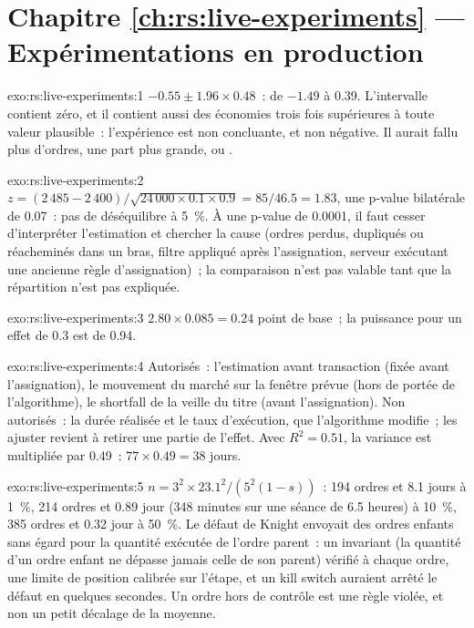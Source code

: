 \section*{Chapitre \ref{ch:rs:live-experiments} --- Expérimentations en production}

\begin{solution}{exo:rs:live-experiments:1}
$-0.55 \pm 1.96 \times 0.48$~: de $-1.49$ à 0.39. L'intervalle contient zéro, et il contient aussi des économies trois fois supérieures à toute valeur plausible~: l'expérience est
non concluante, et non négative. Il aurait fallu plus d'ordres, une part plus grande, ou .
\end{solution}

\begin{solution}{exo:rs:live-experiments:2}
$z = (2\,485 - 2\,400)/\sqrt{24\,000 \times 0.1 \times 0.9} = 85/46.5 = 1.83$, une p-value bilatérale de 0.07~: pas de déséquilibre à 5~\%. À une p-value de 0.0001, il faut cesser d'interpréter
l'estimation et chercher la cause (ordres perdus, dupliqués ou réacheminés dans un bras, filtre appliqué après l'assignation, serveur exécutant une ancienne règle d'assignation)~;
la comparaison n'est pas valable tant que la répartition n'est pas expliquée.
\end{solution}

\begin{solution}{exo:rs:live-experiments:3}
$2.80 \times 0.085 = 0.24$ point de base~; la puissance pour un effet de 0.3 est de 0.94.
\end{solution}

\begin{solution}{exo:rs:live-experiments:4}
Autorisés~: l'estimation avant transaction (fixée avant l'assignation), le mouvement du marché sur la fenêtre prévue (hors de portée de l'algorithme), le
shortfall de la veille du titre (avant l'assignation). Non autorisés~: la durée réalisée et le taux d'exécution, que l'algorithme modifie~; les ajuster
revient à retirer une partie de l'effet. Avec $R^2 = 0.51$, la variance est multipliée par 0.49~: $77 \times 0.49 = 38$ jours.
\end{solution}

\begin{solution}{exo:rs:live-experiments:5}
$n = 3^2 \times 23.1^2/(5^2(1-s))$~: 194 ordres et 8.1 jours à 1~\%, 214 ordres et 0.89 jour (348 minutes sur une séance de 6.5 heures) à 10~\%, 385 ordres et
0.32 jour à 50~\%. Le défaut de Knight envoyait des ordres enfants sans égard pour la quantité exécutée de l'ordre parent~: un invariant (la quantité d'un ordre enfant ne dépasse jamais celle de son parent)
vérifié à chaque ordre, une limite de position calibrée sur l'étape, et un kill switch auraient arrêté le défaut en quelques secondes. Un ordre hors de contrôle est une règle violée, et non
un petit décalage de la moyenne.
\end{solution}

